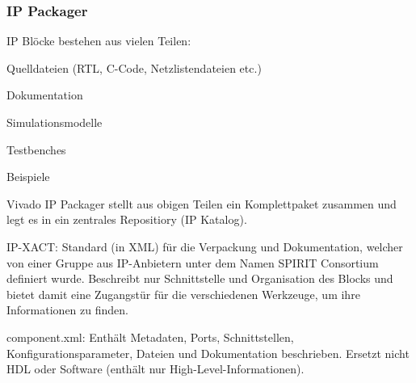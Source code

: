 \subsubsection{IP Packager}
\begin{compactitem}
    \item IP Blöcke bestehen aus vielen Teilen:
    \begin{compactitem}
        \item Quelldateien (RTL, C-Code, Netzlistendateien etc.)
        \item Dokumentation
        \item Simulationsmodelle
        \item Testbenches
        \item Beispiele
    \end{compactitem}
    \item Vivado IP Packager stellt aus obigen Teilen ein Komplettpaket zusammen und legt es in ein zentrales Repositiory (IP Katalog).
    \item IP-XACT: Standard (in XML) für die Verpackung und Dokumentation, welcher von einer Gruppe aus IP-Anbietern unter dem Namen SPIRIT Consortium definiert wurde. Beschreibt nur Schnittstelle und Organisation des Blocks und bietet damit eine Zugangstür für die verschiedenen Werkzeuge, um ihre Informationen zu finden.
    \item component.xml: Enthält Metadaten, Ports, Schnittstellen, Konfigurationsparameter, Dateien und Dokumentation beschrieben. Ersetzt nicht HDL oder Software (enthält nur High-Level-Informationen).
\end{compactitem}
